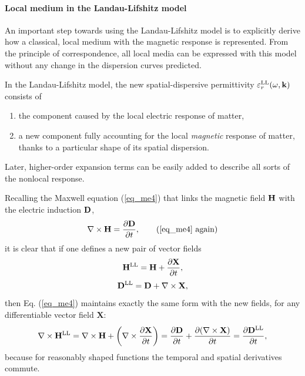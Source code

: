 \paragraph{Local medium in the Landau-Lifshitz model} %
An important step towards using the Landau-Lifshitz model is to explicitly derive how a classical, local medium with the magnetic response is represented. From the principle of correspondence, all local media can be expressed with this model without any change in the dispersion curves predicted. 

In the Landau-Lifshitz model, the new spatial-dispersive permittivity $\varepsilon_r^\text{LL}(\omega, {\mathbf{k}})$ consists of
\begin{enumerate}
 \item{the component caused by the local electric response of matter,} 
 \item{a new component fully accounting for the local \textit{magnetic} response of matter, thanks to a particular shape of its spatial dispersion.}
\end{enumerate}
Later, higher-order expansion terms can be easily added to describe all sorts of the nonlocal response.

Recalling the Maxwell equation (\ref{eq_me4}) that links the magnetic field $\mathbf{H}$ with the electric induction $\mathbf{D}$, 
\begin{equation} \nabla \times \HH =  \frac{\partial \D} {\partial t}, \tag{\ref{eq_me4} \again} \end{equation}
it is clear that if one defines a new pair of vector fields
\begin{equation} {\mathbf{H}^\text{LL}} = \mathbf{H} + \frac{\partial\mathbf{X}}{\partial t}, \label{eq_HHsd}\end{equation}
\begin{equation} {\mathbf{D}^\text{LL}}  = \mathbf{D}  + \nabla\times \mathbf{X}, \label{eq_Dsd}\end{equation}
then Eq. (\ref{eq_me4}) maintains exactly the same form with the new fields, for any differentiable vector field $\mathbf{X}$:
\begin{equation} \nabla \times {\mathbf{H}^\text{LL}} = \nabla \times \mathbf{H} + \left(\nabla\times \frac{\partial\mathbf{X}}{\partial t}\right) = \frac{\partial \mathbf{D}}{\partial t}+ \frac{\partial(\nabla\times \mathbf{X})}{\partial t} =  \frac{\partial {\mathbf{D}^\text{LL}}} {\partial t}, \label{eq_me4sd} \end{equation}
because for reasonably shaped functions the temporal and spatial derivatives commute.

